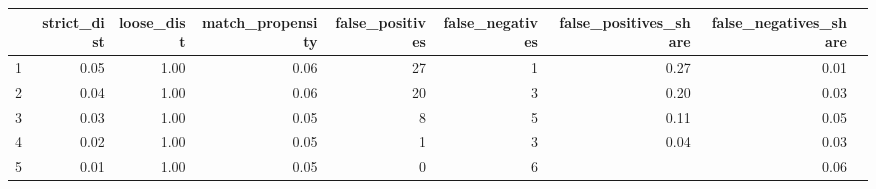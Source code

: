 \begin{tabular}{rrrrrrrrr}
  \hline
  & strict\_dist & loose\_dist & match\_propensity & false\_positives & false\_negatives & false\_positives\_share & false\_negatives\_share \\ 
  \hline
  1 & 0.05 & 1.00 & 0.06 &  27 &   1 & 0.27 & 0.01 \\ 
  2 & 0.04 & 1.00 & 0.06 &  20 &   3 & 0.20 & 0.03 \\ 
  3 & 0.03 & 1.00 & 0.05 &   8 &   5 & 0.11 & 0.05 \\ 
  4 & 0.02 & 1.00 & 0.05 &   1 &   3 & 0.04 & 0.03 \\ 
  5 & 0.01 & 1.00 & 0.05 &   0 &   6 &  & 0.06 \\ 
   \hline
\end{tabular}